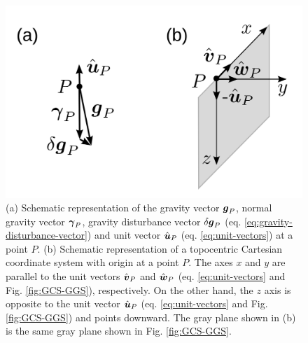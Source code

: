\documentclass[extra]{gji}
\begin{document}
\begin{figure}
    \includegraphics{figures/local-system.png}
    \caption{(a) Schematic representation of the gravity vector
    $\mitbf{g}_{P}$, normal gravity vector $\mitbf{\gamma}_{P}$,
    gravity disturbance vector $\delta \mitbf{g}_{P}$
    (eq. \ref{eq:gravity-disturbance-vector}) and unit vector 
    $\hat{\mitbf{u}}_{P}$ (eq. \ref{eq:unit-vectors}) at a point 
    $P$.
    (b) Schematic representation of a topocentric Cartesian 
    coordinate system with origin at a point $P$. The axes $x$
    and $y$ are parallel to the unit vectors $\hat{\mitbf{v}}_{P}$
    and $\hat{\mitbf{w}}_{P}$ (eq. \ref{eq:unit-vectors} and
    Fig. \ref{fig:GCS-GGS}), respectively. On the other hand, the $z$ axis is opposite to the unit vector $\hat{\mitbf{u}}_{P}$ (eq. 
    \ref{eq:unit-vectors} and Fig. \ref{fig:GCS-GGS}) and points downward. The gray plane shown in (b) is the same gray plane
    shown in Fig. \ref{fig:GCS-GGS}.}
  \label{fig:TCS}
\end{figure}
\end{document}
